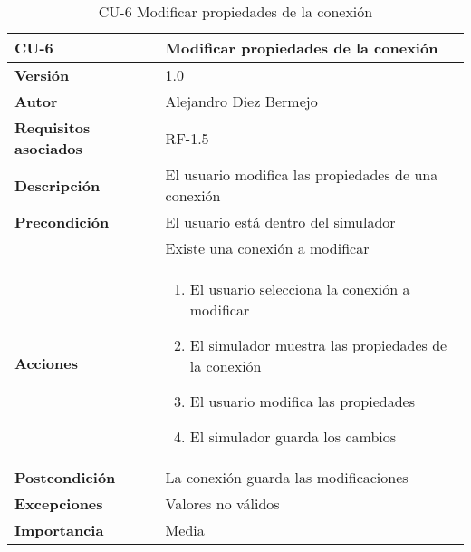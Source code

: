 \begin{table}[p]
	\centering
	\begin{tabularx}{\linewidth}{ p{} p{} }
		\toprule
		\textbf{CU-6}    & \textbf{Modificar propiedades de la conexión}\\
		\toprule
		\textbf{Versión}              & 1.0    \\
		\textbf{Autor}                & Alejandro Diez Bermejo \\
		\textbf{Requisitos asociados} & RF-1.5 \\
		\textbf{Descripción}          & El usuario modifica las propiedades de una conexión \\
		\textbf{Precondición}         & El usuario está dentro del simulador \\
                                      & Existe una conexión a modificar \\
		\textbf{Acciones}             &
		\begin{enumerate}
			\def\labelenumi{\arabic{enumi}.}
			\tightlist
			\item El usuario selecciona la conexión a modificar
            \item El simulador muestra las propiedades de la conexión
            \item El usuario modifica las propiedades
            \item El simulador guarda los cambios
		\end{enumerate}\\
		\textbf{Postcondición}        & La conexión guarda las modificaciones \\
		\textbf{Excepciones}          & Valores no válidos \\
		\textbf{Importancia}          & Media \\
		\bottomrule
	\end{tabularx}
	\caption{CU-6 Modificar propiedades de la conexión}
\end{table}

